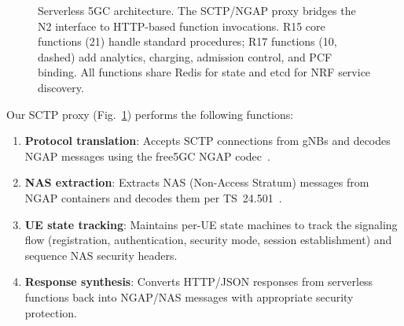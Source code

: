 \documentclass[conference]{IEEEtran}
\begin{document}
\begin{figure}[t]
\caption{Serverless 5GC architecture. The SCTP/NGAP proxy bridges the N2 interface to HTTP-based function invocations. R15 core functions (21) handle standard procedures; R17 functions (10, dashed) add analytics, charging, admission control, and PCF binding. All functions share Redis for state and etcd for NRF service discovery.}
\label{fig:architecture}
\end{figure}

Our SCTP proxy (Fig.~\ref{fig:architecture}) performs the following functions:
\begin{enumerate}
    \item \textbf{Protocol translation}: Accepts SCTP connections from gNBs and decodes NGAP messages using the free5GC NGAP codec~\cite{free5gc-ngap}.
    \item \textbf{NAS extraction}: Extracts NAS (Non-Access Stratum) messages from NGAP containers and decodes them per TS~24.501~\cite{3gpp-24501}.
    \item \textbf{UE state tracking}: Maintains per-UE state machines to track the signaling flow (registration, authentication, security mode, session establishment) and sequence NAS security headers.
    \item \textbf{Response synthesis}: Converts HTTP/JSON responses from serverless functions back into NGAP/NAS messages with appropriate security protection.
\end{enumerate}
\end{document}
